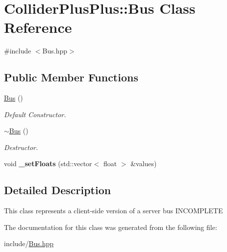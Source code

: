 \hypertarget{classColliderPlusPlus_1_1Bus}{\section{Collider\-Plus\-Plus\-:\-:Bus Class Reference}
\label{classColliderPlusPlus_1_1Bus}
}


{\ttfamily \#include $<$Bus.\-hpp$>$}

\subsection*{Public Member Functions}
\begin{DoxyCompactItemize}
\item 
\hypertarget{classColliderPlusPlus_1_1Bus_a2573707ab0adc378f8c4db656209c289}{\hyperlink{classColliderPlusPlus_1_1Bus_a2573707ab0adc378f8c4db656209c289}{Bus} ()}\label{classColliderPlusPlus_1_1Bus_a2573707ab0adc378f8c4db656209c289}

\begin{DoxyCompactList}\small\item\em Default Constructor. \end{DoxyCompactList}\item 
\hypertarget{classColliderPlusPlus_1_1Bus_a3940fb5fc3ab9d5b84c35fc1c9bd7ebe}{\hyperlink{classColliderPlusPlus_1_1Bus_a3940fb5fc3ab9d5b84c35fc1c9bd7ebe}{$\sim$\-Bus} ()}\label{classColliderPlusPlus_1_1Bus_a3940fb5fc3ab9d5b84c35fc1c9bd7ebe}

\begin{DoxyCompactList}\small\item\em Destructor. \end{DoxyCompactList}\item 
\hypertarget{classColliderPlusPlus_1_1Bus_a8cd49b944ff03a2bef2b84889b33d24c}{void {\bfseries \-\_\-set\-Floats} (std\-::vector$<$ float $>$ \&values)}\label{classColliderPlusPlus_1_1Bus_a8cd49b944ff03a2bef2b84889b33d24c}

\end{DoxyCompactItemize}


\subsection{Detailed Description}
This class represents a client-\/side version of a server bus I\-N\-C\-O\-M\-P\-L\-E\-T\-E 

The documentation for this class was generated from the following file\-:\begin{DoxyCompactItemize}
\item 
include/\hyperlink{Bus_8hpp}{Bus.\-hpp}\end{DoxyCompactItemize}
